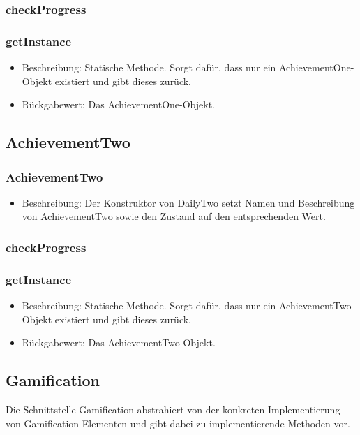 \documentclass[a4paper]{scrreprt}
\begin{document}
	\subsubsection{checkProgress}
	\subsubsection{getInstance}
	\begin{itemize}
		\item Beschreibung: Statische Methode. Sorgt dafür, dass nur ein AchievementOne-Objekt existiert und gibt dieses zurück.
		\item Rückgabewert: Das AchievementOne-Objekt.
	\end{itemize}
	
	\subsection{AchievementTwo}
	\subsubsection{AchievementTwo}
	\begin{itemize}
		\item Beschreibung: Der Konstruktor von DailyTwo setzt Namen und Beschreibung von AchievementTwo sowie den Zustand auf den entsprechenden Wert.
	\end{itemize}
	\subsubsection{checkProgress}
	\subsubsection{getInstance}
	\begin{itemize}
		\item Beschreibung: Statische Methode. Sorgt dafür, dass nur ein AchievementTwo-Objekt existiert und gibt dieses zurück.
		\item Rückgabewert: Das AchievementTwo-Objekt.
	\end{itemize}
	
	
	\subsection{Gamification}
	Die Schnittstelle Gamification abstrahiert von der konkreten Implementierung von Gamification-Elementen und gibt dabei zu implementierende Methoden vor.
\end{document}
